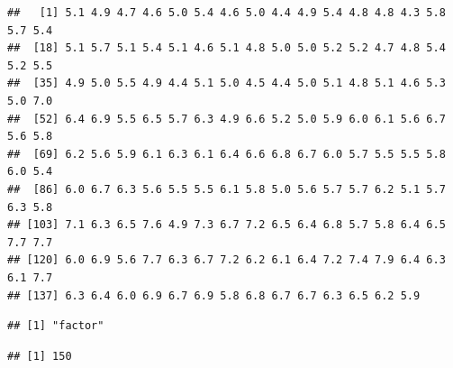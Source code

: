 \documentclass[]{article}
\newenvironment{Shaded}{\begin{snugshade}}{\end{snugshade}}
\newcommand{\KeywordTok}[1]{\textcolor[rgb]{0.13,0.29,0.53}{\textbf{#1}}}
\newcommand{\CommentTok}[1]{\textcolor[rgb]{0.56,0.35,0.01}{\textit{#1}}}
\newcommand{\OperatorTok}[1]{\textcolor[rgb]{0.81,0.36,0.00}{\textbf{#1}}}
\newcommand{\NormalTok}[1]{#1}
\begin{document}
\begin{Shaded}
\end{Shaded}

\begin{verbatim}
##   [1] 5.1 4.9 4.7 4.6 5.0 5.4 4.6 5.0 4.4 4.9 5.4 4.8 4.8 4.3 5.8 5.7 5.4
##  [18] 5.1 5.7 5.1 5.4 5.1 4.6 5.1 4.8 5.0 5.0 5.2 5.2 4.7 4.8 5.4 5.2 5.5
##  [35] 4.9 5.0 5.5 4.9 4.4 5.1 5.0 4.5 4.4 5.0 5.1 4.8 5.1 4.6 5.3 5.0 7.0
##  [52] 6.4 6.9 5.5 6.5 5.7 6.3 4.9 6.6 5.2 5.0 5.9 6.0 6.1 5.6 6.7 5.6 5.8
##  [69] 6.2 5.6 5.9 6.1 6.3 6.1 6.4 6.6 6.8 6.7 6.0 5.7 5.5 5.5 5.8 6.0 5.4
##  [86] 6.0 6.7 6.3 5.6 5.5 5.5 6.1 5.8 5.0 5.6 5.7 5.7 6.2 5.1 5.7 6.3 5.8
## [103] 7.1 6.3 6.5 7.6 4.9 7.3 6.7 7.2 6.5 6.4 6.8 5.7 5.8 6.4 6.5 7.7 7.7
## [120] 6.0 6.9 5.6 7.7 6.3 6.7 7.2 6.2 6.1 6.4 7.2 7.4 7.9 6.4 6.3 6.1 7.7
## [137] 6.3 6.4 6.0 6.9 6.7 6.9 5.8 6.8 6.7 6.7 6.3 6.5 6.2 5.9
\end{verbatim}

\begin{Shaded}
\end{Shaded}

\begin{verbatim}
## [1] "factor"
\end{verbatim}

\begin{Shaded}
\end{Shaded}

\begin{verbatim}
## [1] 150
\end{verbatim}

\begin{Shaded}
\end{Shaded}
\end{document}
